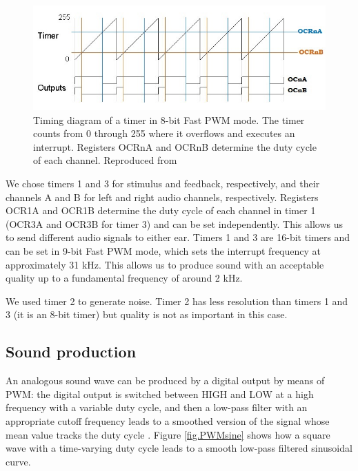 \documentclass[twocolumn]{article}
\begin{document}
\begin{figure}[ht]
    \centering
    \includegraphics[width=\linewidth]{figures/FastPWM_cb.jpg}
    \caption{Timing diagram of a timer in 8-bit Fast PWM mode. The timer counts from 0 through 255 where it overflows and executes an interrupt. Registers OCRnA and OCRnB determine the duty cycle of each channel. Reproduced from \cite{TimersOVF}}
    \label{fig.FastPWM}
\end{figure}

We chose timers 1 and 3 for stimulus and feedback, respectively, and their channels A and B for left and right audio channels, respectively. Registers OCR1A and OCR1B determine the duty cycle of each channel in timer 1 (OCR3A and OCR3B for timer 3) and can be set independently. This allows us to send different audio signals to either ear. Timers 1 and 3 are 16-bit timers and can be set in 9-bit Fast PWM mode, which sets the interrupt frequency at approximately 31 kHz. This allows us to produce sound with an acceptable quality up to a fundamental frequency of around 2 kHz.

We used timer 2 to generate noise. Timer 2 has less resolution than timers 1 and 3 (it is an 8-bit timer) but quality is not as important in this case.


\subsection{Sound production}
\label{sec.sonido}

An analogous sound wave can be produced by a digital output by means of PWM: the digital output is switched between HIGH and LOW at a high frequency with a variable duty cycle, and then a low-pass filter with an appropriate cutoff frequency leads to a smoothed version of the signal whose mean value tracks the duty cycle \cite{arduinofading}. Figure \ref{fig.PWMsine} shows how a square wave with a time-varying duty cycle leads to a smooth low-pass filtered sinusoidal curve.
\end{document}
